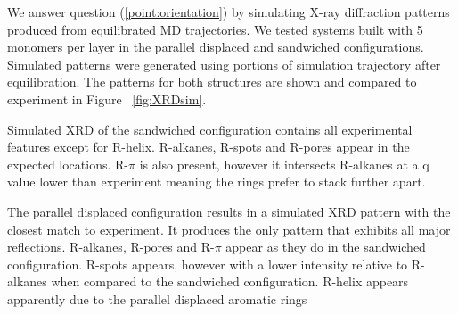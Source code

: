 \documentclass{article}
\begin{document}
  We answer question (\ref{point:orientation}) by simulating X-ray diffraction
  patterns produced from equilibrated MD trajectories. We tested systems built
  with 5 monomers per layer in the parallel displaced and sandwiched
  configurations.  Simulated patterns were generated using portions of simulation
  trajectory after equilibration. The patterns for both structures are shown and
  compared to experiment in Figure ~\ref{fig:XRDsim}.

  Simulated XRD of the sandwiched configuration contains all experimental
  features except for R-helix. R-alkanes, R-spots and R-pores appear in the
  expected locations. R-$\pi$ is also present, however it intersects R-alkanes at
  a q value lower than experiment meaning the rings prefer to stack further
  apart. 

  The parallel displaced configuration results in a simulated XRD pattern with
  the closest match to experiment. It produces the only pattern that exhibits
  all major reflections. R-alkanes, R-pores and R-$\pi$ appear as they do in the
  sandwiched configuration. R-spots appears, however with a lower intensity
  relative to R-alkanes when compared to the sandwiched configuration. R-helix
  appears apparently due to the parallel displaced aromatic rings
\end{document}
